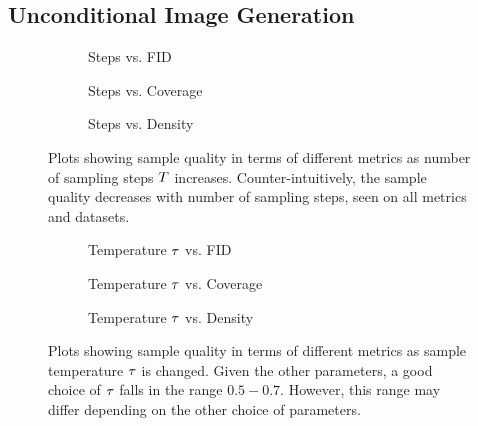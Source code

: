\subsection{Unconditional Image Generation}
\label{subsec:evaluationUnconditional}

\begin{figure}
    \centering
    \begin{subfigure}[b]{0.33\textwidth}
        \centering
        \resizebox{\textwidth}{!}{
            
        }
        \caption{Steps vs. FID}
    \end{subfigure}
    \hfill
    \begin{subfigure}[b]{0.33\textwidth}
        \centering
        \resizebox{\textwidth}{!}{
            
        }
        \caption{Steps vs. Coverage}
    \end{subfigure}
    \hfill
    \begin{subfigure}[b]{0.33\textwidth}
        \centering
        \resizebox{\textwidth}{!}{
            
        }
        \caption{Steps vs. Density}
    \end{subfigure}
    \caption{
        Plots showing sample quality in terms of different metrics as
        number of sampling steps $T$ increases. Counter-intuitively, the
        sample quality decreases with number of sampling steps, seen on
        all metrics and datasets.
    }
    \label{fig:step}
\end{figure}

\begin{figure}
    \begin{subfigure}[b]{0.33\textwidth}
        \centering
        \resizebox{\textwidth}{!}{
            
        }
        \caption{Temperature $\tau$ vs. FID}
    \end{subfigure}
    \hfill
    \begin{subfigure}[b]{0.33\textwidth}
        \centering
        \resizebox{\textwidth}{!}{
            
        }
        \caption{Temperature $\tau$ vs. Coverage}
    \end{subfigure}
    \hfill
    \begin{subfigure}[b]{0.33\textwidth}
        \centering
        \resizebox{\textwidth}{!}{
            
        }
        \caption{Temperature $\tau$ vs. Density}
    \end{subfigure}
    \caption{
        Plots showing sample quality in terms of different metrics as sample
        temperature $\tau$ is changed. Given the other parameters, a good choice
        of $\tau$ falls in the range $0.5-0.7$. However, this range may
        differ depending on the other choice of parameters.
    }
    \label{fig:temp}
\end{figure}


